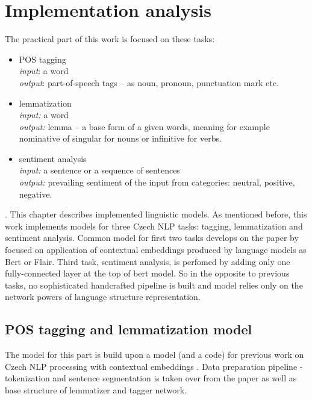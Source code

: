 \chapter{Implementation analysis}
The practical part of this work is focused on these tasks:
\begin{itemize}
\item POS tagging \\
\textit{input}: a word \\
\textit{output}: part-of-speech tags -- as noun, pronoun, punctuation mark etc.
\item lemmatization \\
\textit{input:} a word \\
\textit{output:} lemma -- a base form of a given words, meaning for example nominative of singular for nouns or infinitive for verbs. 
\item sentiment analysis \\
\textit{input:} a sentence or a sequence of sentences \\
\textit{output:} prevailing sentiment of the input from categories: neutral, positive, negative.
\end{itemize}.
\label{chap:impl}
This chapter describes implemented linguistic models. As mentioned before, this work implements models for three Czech NLP tasks: tagging, lemmatization and sentiment analysis. Common model for first two tasks develops on the paper by \cite[]{straka2019czech} focused on application of contextual embeddings produced by language models as Bert %
 or Flair. %
 Third task, sentiment analysis, is perfomed by adding only one fully-connected layer at the top of bert model. So in the opposite to previous tasks, no sophisticated handcrafted pipeline is built and model relies only on the network powers of language structure representation.
 \section{POS tagging and lemmatization model}
The model for this part is build upon a model (and a code) for previous work on Czech NLP processing with contextual embeddings \cite[]{straka2019czech}. Data preparation %
pipeline - tokenization and sentence segmentation is taken over from the paper as well as base structure of lemmatizer and tagger network. 


